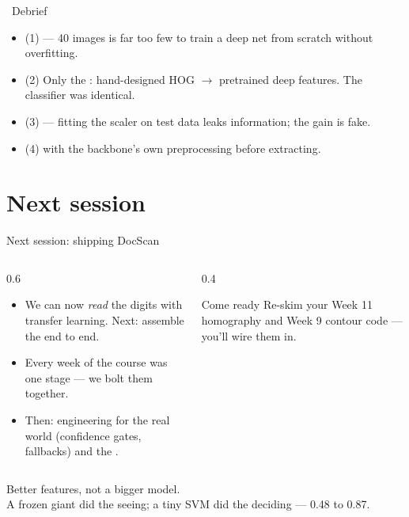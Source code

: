 \documentclass[10pt,aspectratio=169]{beamer}
\begin{document}
\begin{frame}{\faPen~Debrief}
  \begin{itemize}
    \item (1)  — 40 images is far too few to train a deep net from scratch without overfitting.
    \item (2) Only the : hand-designed HOG $\rightarrow$ pretrained deep features. The classifier was identical.
    \item (3)  — fitting the scaler on test data leaks information; the gain is fake.
    \item (4)  with the backbone's own preprocessing before extracting.
  \end{itemize}
\end{frame}

\section{Next session}

\begin{frame}{Next session: shipping DocScan}
  \begin{columns}[T]
    \begin{column}{0.6\textwidth}
      \begin{itemize}
        \item We can now \emph{read} the digits with transfer learning. Next: assemble the
               end to end.
        \item Every week of the course was one stage — we bolt them together.
        \item Then: engineering for the real world (confidence gates, fallbacks) and the
              .
      \end{itemize}
    \end{column}
    \begin{column}{0.4\textwidth}
      \begin{alertblock}{Come ready}
        Re-skim your Week 11 homography and Week 9 contour code — you'll wire them in.
      \end{alertblock}
    \end{column}
  \end{columns}
\end{frame}

\begin{frame}[standout]
  Better features, not a bigger model.\\[4pt]
  \normalsize A frozen giant did the seeing; a tiny SVM did the deciding — 0.48 to 0.87.
\end{frame}
\end{document}
